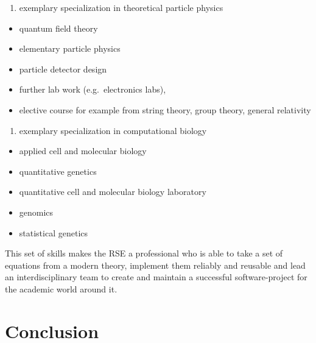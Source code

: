 \documentclass[
        twocolumn,german,biblatex
    ]{article}
\providecommand{\tightlist}{%
    \setlength{\itemsep}{0pt}\setlength{\parskip}{0pt}}
\begin{document}
\begin{enumerate}
      \begin{enumerate}
      \def\labelenumii{\alph{enumii}.}
      \tightlist
      \item
        exemplary specialization in theoretical particle physics
      \end{enumerate}

      \begin{itemize}
      \tightlist
      \item
        quantum field theory
      \item
        elementary particle physics
      \item
        particle detector design
      \item
        further lab work (e.g.~electronics labs),
      \item
        elective course for example from string theory, group theory,
        general relativity
      \end{itemize}

      \begin{enumerate}
      \def\labelenumii{\alph{enumii}.}
      \setcounter{enumii}{1}
      \tightlist
      \item
        exemplary specialization in computational biology
      \end{enumerate}

      \begin{itemize}
      \tightlist
      \item
        applied cell and molecular biology
      \item
        quantitative genetics
      \item
        quantitative cell and molecular biology laboratory
      \item
        genomics
      \item
        statistical genetics
      \end{itemize}
    \end{enumerate}

    This set of skills makes the RSE a professional who is able to take
    a set of equations from a modern theory, implement them reliably and
    reusable and lead an interdisciplinary team to create and maintain a
    successful software-project for the academic world around it.

    \section{Conclusion}\label{conclusion}
\end{document}
